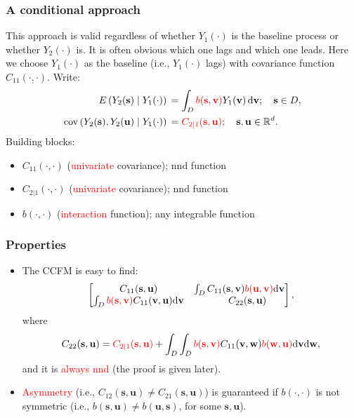 \documentclass{beamer}
\newcommand{\svec} {\textbf{s}}
\newcommand{\uvec} {\textbf{u}}
\newcommand{\s}{\mathbf{s}}
\renewcommand{\v}{\mathbf{v}}
\renewcommand{\u}{\mathbf{u}}
\newcommand{\w}{\mathbf{w}}
\renewcommand{\d}{\mathrm{d}}
\newcommand{\E}{E}
\newcommand{\cov}{\mathrm{cov}}
\newcommand{\red}{\textcolor{red}}%
\begin{document}


\begin{frame}
\frametitle{A conditional approach}
This approach is valid regardless of whether $Y_1(\cdot)$ is the baseline process or whether $Y_2(\cdot)$ is. It is often obvious which one lags and which one leads. Here we choose $Y_1(\cdot)$ as the baseline (i.e., $Y_1(\cdot)$ lags) with covariance function $C_{11}(\cdot,\cdot)$. Write:
\begin{align*}
\E\left(Y_2(\s)\mid Y_1(\cdot)\right)&\,=\int_D{\textcolor{red}{b(\s,\v)}Y_1(\v)\,\d \v};\quad \s\in D,\\
\cov\left(Y_2(\s),Y_2(\u)\mid Y_1(\cdot)\right)&\,=\textcolor{red}{C_{2\mid 1}(\s,\u)};\quad \s,\u\in \mathbb{R}^d.
\end{align*}
Building blocks:
\begin{itemize}
\item $C_{11}(\cdot,\cdot)$ (\textcolor{red}{univariate} covariance); nnd function
\item $C_{2|1}(\cdot,\cdot)$ (\textcolor{red}{univariate} covariance); nnd function
\item $b(\cdot,\cdot)$ (\textcolor{red}{interaction} function); any integrable function
\end{itemize}
\end{frame}


\begin{frame}
\frametitle{Properties}
\begin{itemize}
\item The CCFM is easy to find:
$$
\begin{bmatrix} C_{11}(\s,\u) & \int_DC_{11}(\s,\v)\textcolor{red}{b(\u,\v)}\d\v \\ \int_D\textcolor{red}{b(\s,\v)}C_{11}(\v,\u)\d\v & ~~~~~C_{22}(\s,\u)\end{bmatrix},
$$
where 
$$
C_{22}(\s,\u) = \textcolor{red}{C_{2\mid 1}(\s,\u)}+\int_D\int_D \red{b(\s,\v)}C_{11}(\v,\w) \red{b(\w,\u)}\d\v\d\w,
$$
and it is \textcolor{red}{always nnd} (the proof is given later). \vfill

\item \textcolor{red}{Asymmetry} (i.e., $C_{12}(\svec,\uvec) \ne C_{21}(\svec,\uvec)$) is guaranteed if $b(\cdot,\cdot)$ is not symmetric (i.e., $b(\s,\u)\neq b(\u,\s)$, for some $\s,\u$).\vfill
\end{itemize}
\end{frame}
\end{document}
